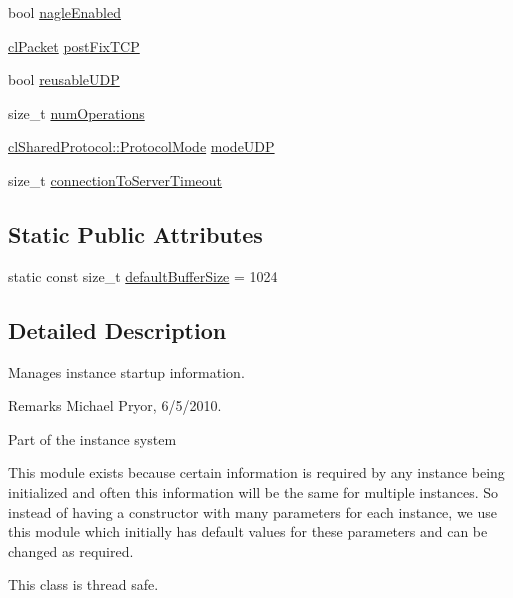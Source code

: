 \begin{DoxyCompactItemize}
bool \hyperlink{classcl_instance_profile_a5618aef6c4f569e498446b398c60dc12}{nagleEnabled}
\item 
\hyperlink{classcl_packet}{clPacket} \hyperlink{classcl_instance_profile_a128c796dc4336367dbe442f8347236da}{postFixTCP}
\item 
bool \hyperlink{classcl_instance_profile_a9f2be3ef8894a136d5af5df66150765f}{reusableUDP}
\item 
size\_\-t \hyperlink{classcl_instance_profile_ac223cf65d4308e8f5c58472503e2ccab}{numOperations}
\item 
\hyperlink{classcl_shared_protocol_a4b0b9c82b8ae4eee78c6308c35afd47b}{clSharedProtocol::ProtocolMode} \hyperlink{classcl_instance_profile_a5ca5a16aac3d34666029cc91d9a87657}{modeUDP}
\item 
size\_\-t \hyperlink{classcl_instance_profile_a555a74500b6b0e6cc660e8f3e1180d8f}{connectionToServerTimeout}
\end{DoxyCompactItemize}
\subsection*{Static Public Attributes}
\begin{DoxyCompactItemize}
\item 
static const size\_\-t \hyperlink{classcl_instance_profile_a97c453f7fe529bd5a77d609fea65a539}{defaultBufferSize} = 1024
\end{DoxyCompactItemize}


\subsection{Detailed Description}
Manages instance startup information. \begin{DoxyRemark}{Remarks}
Michael Pryor, 6/5/2010.
\end{DoxyRemark}
Part of the instance system \par
 This module exists because certain information is required by any instance being initialized and often this information will be the same for multiple instances. So instead of having a constructor with many parameters for each instance, we use this module which initially has default values for these parameters and can be changed as required.\par
\par


This class is thread safe. 

